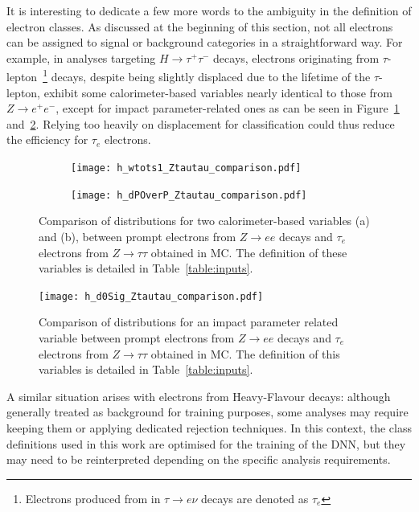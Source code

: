 It is interesting to dedicate a few more words to the ambiguity in the definition of electron classes. As discussed at the beginning of this section, not all electrons can be assigned to signal or background categories in a straightforward way. For example, in analyses targeting $H \rightarrow \tau^+\tau^-$ decays, electrons originating from $\tau$-lepton~\footnote{Electrons produced from in $\tau \to e \nu$ decays are denoted as $\tau_{e}$} decays, despite being slightly displaced due to the lifetime of the $\tau$-lepton, exhibit some calorimeter-based variables nearly identical to those from $Z \rightarrow e^{+}e^{-}$, except for impact parameter-related ones as can be seen in Figure~\ref{fig:compare} and~\ref{fig:compare2}. Relying too heavily on displacement for classification could thus reduce the efficiency for $\tau_e$ electrons. 
\begin{figure}[htbp]
  \centering
  \begin{subfigure}[b]{0.495\textwidth}
      \texttt{[image: h\_wtots1\_Ztautau\_comparison.pdf]}
      \caption{}
  \end{subfigure}
  \begin{subfigure}[b]{0.495\textwidth}
      \texttt{[image: h\_dPOverP\_Ztautau\_comparison.pdf]}
      \caption{}
  \end{subfigure}
  \caption{Comparison of distributions for two calorimeter-based variables (a) and (b), between prompt electrons from $Z \rightarrow ee$ decays and $\tau_{e}$ electrons from $Z \rightarrow \tau\tau$ obtained in MC. The definition of these variables is detailed in Table~\ref{table:inputs}.}
  \label{fig:compare}
\end{figure}


\begin{figure}[htbp]
  \centering
  \texttt{[image: h\_d0Sig\_Ztautau\_comparison.pdf]}
  \caption{Comparison of distributions for an impact parameter related variable between prompt electrons from $Z \rightarrow ee$ decays and $\tau_{e}$ electrons from $Z \rightarrow \tau\tau$ obtained in MC. The definition of this variables is detailed in Table~\ref{table:inputs}.}
  \label{fig:compare2}
\end{figure}
A similar situation arises with electrons from Heavy-Flavour decays: although generally treated as background for training purposes, some analyses may require keeping them or applying dedicated rejection techniques. In this context, the class definitions used in this work are optimised for the training of the DNN, but they may need to be reinterpreted depending on the specific analysis requirements.


